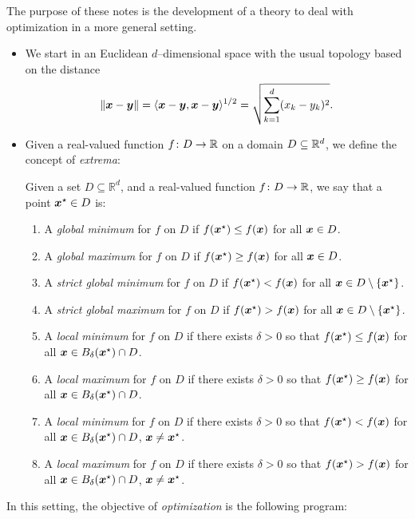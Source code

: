 The purpose of these notes is the development of a theory to deal with optimization in a more general setting.
\begin{itemize}
	\item We start in an Euclidean $d$--dimensional space with the usual topology based on the distance 
	\begin{equation*}
	\lVert \boldsymbol{x}-\boldsymbol{y} \rVert = \langle \boldsymbol{x}-\boldsymbol{y}, \boldsymbol{x}-\boldsymbol{y} \rangle^{1/2} = \sqrt{\sum_{k=1}^d (x_k-y_k)^2 }.
	\end{equation*}
	\item Given a real-valued function $f\colon D \to \mathbb{R}$ on a domain $D \subseteq \mathbb{R}^d$, we define the concept of \emph{extrema}:
	\begin{definition}\label{def:extrema}
	Given a set $D \subseteq \mathbb{R}^d$, and a real-valued function $f\colon D \to \mathbb{R}$, we say that a point $\boldsymbol{x}^{\star} \in D$ is:
	\begin{enumerate}
		\item A \emph{global minimum} for $f$ on $D$ if $f(\boldsymbol{x}^{\star}) \leq f(\boldsymbol{x})$ for all $\boldsymbol{x} \in D$.
		\item A \emph{global maximum} for $f$ on $D$ if $f(\boldsymbol{x}^{\star}) \geq f(\boldsymbol{x})$ for all $\boldsymbol{x} \in D$.
		\item A \emph{strict global minimum} for $f$ on $D$ if $f(\boldsymbol{x}^{\star}) < f(\boldsymbol{x})$ for all $\boldsymbol{x} \in D \setminus \{ \boldsymbol{x}^{\star} \}$.
		\item A \emph{strict global maximum} for $f$ on $D$ if $f(\boldsymbol{x}^{\star}) > f(\boldsymbol{x})$ for all $\boldsymbol{x} \in D \setminus \{ \boldsymbol{x}^{\star} \}$.
		\item A \emph{local minimum} for $f$ on $D$ if there exists $\delta>0$ so that  $f(\boldsymbol{x}^{\star}) \leq f(\boldsymbol{x})$ for all $\boldsymbol{x} \in B_\delta(\boldsymbol{x}^{\star})\cap D$.
		\item A \emph{local maximum} for $f$ on $D$ if there exists $\delta>0$ so that  $f(\boldsymbol{x}^{\star}) \geq f(\boldsymbol{x})$ for all $\boldsymbol{x} \in B_\delta(\boldsymbol{x}^{\star})\cap D$.
		\item A \emph{local minimum} for $f$ on $D$ if there exists $\delta>0$ so that  $f(\boldsymbol{x}^{\star}) < f(\boldsymbol{x})$ for all $\boldsymbol{x} \in B_\delta(\boldsymbol{x}^{\star})\cap D$, $\boldsymbol{x} \neq \boldsymbol{x}^{\star}$.
		\item A \emph{local maximum} for $f$ on $D$ if there exists $\delta>0$ so that  $f(\boldsymbol{x}^{\star}) > f(\boldsymbol{x})$ for all $\boldsymbol{x} \in B_\delta(\boldsymbol{x}^{\star})\cap D$, $\boldsymbol{x} \neq \boldsymbol{x}^{\star}$.
	\end{enumerate}
	\end{definition}	
\end{itemize}
In this setting, the objective of \emph{optimization} is the following program:
